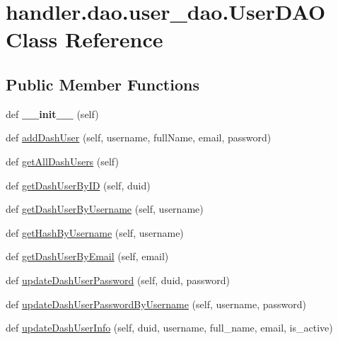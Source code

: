 \hypertarget{classhandler_1_1dao_1_1user__dao_1_1_user_d_a_o}{}\section{handler.\+dao.\+user\+\_\+dao.\+User\+D\+AO Class Reference}
\label{classhandler_1_1dao_1_1user__dao_1_1_user_d_a_o}
\subsection*{Public Member Functions}
\begin{DoxyCompactItemize}
\item 
\mbox{\label{classhandler_1_1dao_1_1user__dao_1_1_user_d_a_o_aa0472f43603847189aa73d523db657b0}} 
def {\bfseries \+\_\+\+\_\+init\+\_\+\+\_\+} (self)
\item 
def \hyperlink{classhandler_1_1dao_1_1user__dao_1_1_user_d_a_o_a6e3f0dfc7e16a8ec2313502ca0298397}{add\+Dash\+User} (self, username, full\+Name, email, password)
\item 
def \hyperlink{classhandler_1_1dao_1_1user__dao_1_1_user_d_a_o_a25d86e662021b773fd0b49299079f443}{get\+All\+Dash\+Users} (self)
\item 
def \hyperlink{classhandler_1_1dao_1_1user__dao_1_1_user_d_a_o_ad9be9aa0752a73abc15d413ff6f6f640}{get\+Dash\+User\+By\+ID} (self, duid)
\item 
def \hyperlink{classhandler_1_1dao_1_1user__dao_1_1_user_d_a_o_a8c86f277f03acade4ca12983f0a05d10}{get\+Dash\+User\+By\+Username} (self, username)
\item 
def \hyperlink{classhandler_1_1dao_1_1user__dao_1_1_user_d_a_o_aa2275f3d06d7b6e83597600c1e6eccbd}{get\+Hash\+By\+Username} (self, username)
\item 
def \hyperlink{classhandler_1_1dao_1_1user__dao_1_1_user_d_a_o_ad69106a48bfd2570d8f73797ba15a9f0}{get\+Dash\+User\+By\+Email} (self, email)
\item 
def \hyperlink{classhandler_1_1dao_1_1user__dao_1_1_user_d_a_o_a5cb109c59e12af858342091c0bff278b}{update\+Dash\+User\+Password} (self, duid, password)
\item 
def \hyperlink{classhandler_1_1dao_1_1user__dao_1_1_user_d_a_o_a2defb0680d461acabaf05daf03214938}{update\+Dash\+User\+Password\+By\+Username} (self, username, password)
\item 
def \hyperlink{classhandler_1_1dao_1_1user__dao_1_1_user_d_a_o_aecd7d28a6180b613a29020d8a36aa49d}{update\+Dash\+User\+Info} (self, duid, username, full\+\_\+name, email, is\+\_\+active)

\end{DoxyCompactItemize}

